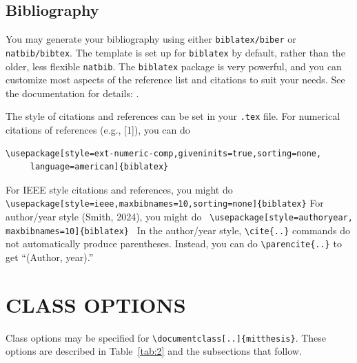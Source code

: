 \documentclass[11pt]{article}
\begin{document}
\subsection{Bibliography}
You may generate your bibliography using either \texttt{biblatex/biber} or \texttt{natbib/bibtex}.  The template is set up for \texttt{biblatex} by default, rather than the older, less flexible \texttt{natbib}.  The \texttt{biblatex} package is very powerful, and you can customize most aspects of the reference list and citations to suit your needs. See the documentation for details: .

The style of citations and references can be set in your \texttt{.tex} file. For numerical citations of references (e.g., [1]), you can do
\begin{verbatim}
\usepackage[style=ext-numeric-comp,giveninits=true,sorting=none,
     language=american]{biblatex}
\end{verbatim}
\noindent For IEEE style citations and references, you might do
\vskip 5pt
\verb| \usepackage[style=ieee,maxbibnames=10,sorting=none]{biblatex}|
\vskip 5pt
\noindent For author/year style (Smith, 2024), you might do
\vskip 5pt
\verb| \usepackage[style=authoryear, maxbibnames=10]{biblatex} |
\vskip 5pt
\noindent In the author/year style, \verb|\cite{..}| commands do not automatically produce parentheses. Instead, you can do
\verb|\parencite{..}| to get ``(Author, year).''

\section{CLASS OPTIONS}
Class options may be specified for \verb|\documentclass[..]{mitthesis}|. These options are described in Table~\ref{tab:2} and the subsections that follow.
\end{document}
